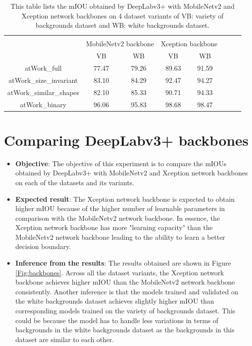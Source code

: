 	\begin{table}
	\centering
	\begin{tabular}{|c|c|c|c|c|c|c|c|}
	\hline 
	\multicolumn{ 1}{|l|}{\makecell{\textbf{Dataset variant}}} & \multicolumn{ 4}{l|}{\makecell{\textbf{mIOU in \%}}} \\ \cline{ 2- 5}
	\multicolumn{ 1}{|l|}{} & \multicolumn{ 2}{l|}{MobileNetv2 backbone} & \multicolumn{ 2}{l|}{Xception backbone} \\ \cline{ 2- 5}
	\multicolumn{ 1}{|l|}{} & VB & WB & VB & WB \\ \hline 
	atWork\_full & 77.47 & 79.26 & 89.63 & 91.59 \\ 
	\hline 
	atWork\_size\_invariant & 83.10 & 84.29 & 92.47 & 94.27 \\ 
	\hline 
	atWork\_similar\_shapes & 82.10 & 85.33 & 90.71 & 94.33 \\ 
	\hline 
	atWork\_binary & 96.06 & 95.83 & 98.68 & 98.47 \\ 
	\hline 
	\end{tabular}
	\caption{This table lists the mIOU obtained by DeepLabv3+ with MobileNetv2 and Xception network backbones on 4 dataset variants of VB: variety of backgrounds dataset and WB: white backgrounds dataset.} 
	\label{Table:vars}
\end{table}

\section{Comparing DeepLabv3+ backbones}
\label{section:backbones}

	\begin{itemize}
		\item \textbf{Objective}: The objective of this experiment is to compare the mIOUs obtained by DeepLabv3+ with MobileNetv2 and Xception network backbones on each of the datasets and its variants.
		\item \textbf{Expected result}: The Xception network backbone is expected to obtain higher mIOU because of the higher number of learnable parameters in comparison with the MobileNetv2 network backbone. In essence, the Xception network backbone has more "learning capacity" than the MobileNetv2 network backbone leading to the ability to learn a better decision boundary.
		\item \textbf{Inference from the results}: The results obtained are shown in Figure \ref{Fig:backbones}. Across all the dataset variants, the Xception network backbone achieves higher mIOU than the MobileNetv2 network backbone consistently. Another inference is that the models trained and validated on the white backgrounds dataset achieves slightly higher mIOU than corresponding models trained on the variety of backgrounds dataset. This could be because the model has to handle less variations in terms of backgrounds in the white backgrounds dataset as the backgrounds in this dataset are similar to each other.
	\end{itemize}

